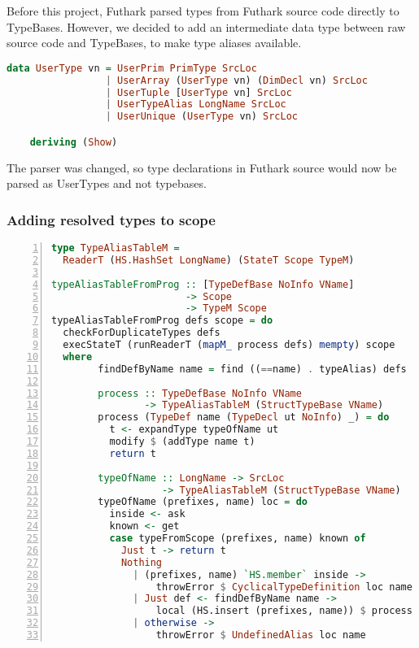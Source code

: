Before this project, Futhark parsed types from Futhark source code directly to
TypeBases.
However, we decided to add an intermediate data type between raw source
code and TypeBases, to make type aliases available.

\begin{lstlisting}[language=Haskell]
data UserType vn = UserPrim PrimType SrcLoc
                 | UserArray (UserType vn) (DimDecl vn) SrcLoc
                 | UserTuple [UserType vn] SrcLoc
                 | UserTypeAlias LongName SrcLoc
                 | UserUnique (UserType vn) SrcLoc

    deriving (Show)
\end{lstlisting}

The parser was changed, so type declarations in Futhark source would now be parsed as UserTypes and not
typebases.

\subsubsection{Adding resolved types to scope}\label{typealiasingcode}
\begin{lstlisting}[language=Haskell, numbers=left]
  type TypeAliasTableM =
  ReaderT (HS.HashSet LongName) (StateT Scope TypeM)

typeAliasTableFromProg :: [TypeDefBase NoInfo VName]
                       -> Scope
                       -> TypeM Scope
typeAliasTableFromProg defs scope = do
  checkForDuplicateTypes defs
  execStateT (runReaderT (mapM_ process defs) mempty) scope
  where
        findDefByName name = find ((==name) . typeAlias) defs

        process :: TypeDefBase NoInfo VName
                -> TypeAliasTableM (StructTypeBase VName)
        process (TypeDef name (TypeDecl ut NoInfo) _) = do
          t <- expandType typeOfName ut
          modify $ (addType name t)
          return t

        typeOfName :: LongName -> SrcLoc
                   -> TypeAliasTableM (StructTypeBase VName)
        typeOfName (prefixes, name) loc = do
          inside <- ask
          known <- get
          case typeFromScope (prefixes, name) known of
            Just t -> return t
            Nothing
              | (prefixes, name) `HS.member` inside ->
                  throwError $ CyclicalTypeDefinition loc name
              | Just def <- findDefByName name ->
                  local (HS.insert (prefixes, name)) $ process def
              | otherwise ->
                  throwError $ UndefinedAlias loc name
\end{lstlisting}

